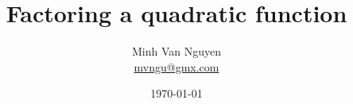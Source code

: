 \documentclass[a4paper,oneside,12pt]{article}
\begin{document}
\title{\Large\bf Factoring a quadratic function}
\author{%
  Minh Van Nguyen \\
  \url{mvngu@gmx.com}
}
\date{\today}
\maketitle
\end{document}
